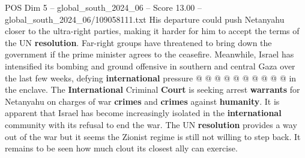 \begin{textsample}{POS Dim 5 – global\_south\_2024\_06 – Score 13.00 – global\_south\_2024\_06/109058111.txt}
His departure could push Netanyahu closer to the ultra-right parties, making it harder for him to accept the terms of the UN \textbf{resolution}.
Far-right groups have threatened to bring down the government if the prime minister agrees to the ceasefire.
Meanwhile, Israel has intensified its bombing and ground offensive in southern and central Gaza over the last few weeks, defying \textbf{international} pressure @ @ @ @ @ @ @ @ @ @ in the enclave.
The \textbf{International} Criminal \textbf{Court} is seeking arrest \textbf{warrants} for Netanyahu on charges of war \textbf{crimes} and \textbf{crimes} against \textbf{humanity}.
It is apparent that Israel has become increasingly isolated in the \textbf{international} community with its refusal to end the war.
The UN \textbf{resolution} provides a way out of the war but it seems the Zionist regime is still not willing to step back.
It remains to be seen how much clout its closest ally can exercise.

\end{textsample}
